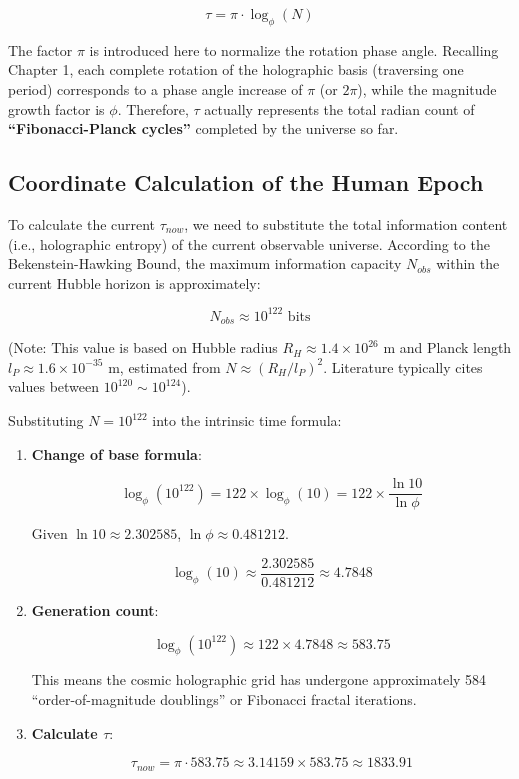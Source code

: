 \[\tau = \pi \cdot \log_{\phi} (N)\]

The factor $\pi$ is introduced here to normalize the rotation phase angle. Recalling Chapter 1, each complete rotation of the holographic basis (traversing one period) corresponds to a phase angle increase of $\pi$ (or $2\pi$), while the magnitude growth factor is $\phi$. Therefore, $\tau$ actually represents the total radian count of \textbf{``Fibonacci-Planck cycles''} completed by the universe so far.

\subsection{Coordinate Calculation of the Human Epoch}

To calculate the current $\tau_{now}$, we need to substitute the total information content (i.e., holographic entropy) of the current observable universe.
According to the Bekenstein-Hawking Bound, the maximum information capacity $N_{obs}$ within the current Hubble horizon is approximately:

\[N_{obs} \approx 10^{122} \text{ bits}\]

(Note: This value is based on Hubble radius $R_H \approx 1.4 \times 10^{26}$ m and Planck length $l_P \approx 1.6 \times 10^{-35}$ m, estimated from $N \approx (R_H/l_P)^2$. Literature typically cites values between $10^{120} \sim 10^{124}$).

Substituting $N = 10^{122}$ into the intrinsic time formula:

\begin{enumerate}
\item \textbf{Change of base formula}:

   \[\log_{\phi}(10^{122}) = 122 \times \log_{\phi}(10) = 122 \times \frac{\ln 10}{\ln \phi}\]

   Given $\ln 10 \approx 2.302585$, $\ln \phi \approx 0.481212$.

   \[\log_{\phi}(10) \approx \frac{2.302585}{0.481212} \approx 4.7848\]

\item \textbf{Generation count}:

   \[\log_{\phi}(10^{122}) \approx 122 \times 4.7848 \approx 583.75\]

   This means the cosmic holographic grid has undergone approximately 584 ``order-of-magnitude doublings'' or Fibonacci fractal iterations.

\item \textbf{Calculate $\tau$}:

   \[\tau_{now} = \pi \cdot 583.75 \approx 3.14159 \times 583.75 \approx 1833.91\]
\end{enumerate}

